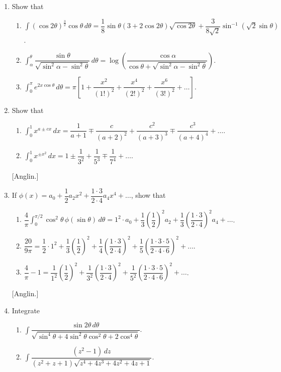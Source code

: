 \documentclass[11pt, a4paper]{article}
\newcommand{\source}[1]{\hfill\textnormal{[#1]}}
\begin{document}
\begin{enumerate}[leftmargin=2em]
\item Show that
\begin{enumerate}[label=(\roman*)]
\item $\displaystyle\int (\cos2\theta)^{\frac32}\cos\theta\,d\theta=\dfrac18\sin\theta(3+2\cos2\theta)\sqrt{\cos2\theta}+\dfrac{3}{8\sqrt2}\sin^{-1}(\sqrt2\sin\theta)$.
\item $\displaystyle\int_\alpha^\theta \dfrac{\sin\theta}{\sqrt{\sin^2\alpha-\sin^2\theta}}\,d\theta=\log\left(\dfrac{\cos\alpha}{\cos\theta+\sqrt{\sin^2\alpha-\sin^2\theta}}\right)$.
\item $\displaystyle\int_0^\pi e^{2x\cos\theta}\,d\theta=\pi\left[1+\dfrac{x^2}{(1!)^2}+\dfrac{x^4}{(2!)^2}+\dfrac{x^6}{(3!)^2}+\dots\right]$.
\end{enumerate}

\item Show that
\begin{enumerate}[label=(\roman*)]
\item $\displaystyle\int_0^1 x^{a\pm cx}\,dx=\dfrac{1}{a+1}\mp\dfrac{c}{(a+2)^2}+\dfrac{c^2}{(a+3)^3}\mp\dfrac{c^3}{(a+4)^4}+\dots$.
\item $\displaystyle\int_0^1 x^{\pm x^2}\,dx=1\pm\dfrac{1}{3^2}+\dfrac{1}{5^3}\mp\dfrac{1}{7^4}+\dots$.
\end{enumerate}
\source{Anglin.}

\item If $\phi(x)=a_0+\dfrac{1}{2}a_2x^2+\dfrac{1\cdot3}{2\cdot4}a_4x^4+\dots$, show that
\begin{enumerate}[label=(\roman*)]
\item $\displaystyle\dfrac{4}{\pi}\int_0^{\pi/2}\cos^2\theta\,\phi(\sin\theta)\,d\theta=1^2\cdot a_0+\dfrac13\left(\dfrac12\right)^2a_2+\dfrac13\left(\dfrac{1\cdot3}{2\cdot4}\right)^2a_4+\dots$.
\item $\displaystyle\dfrac{20}{9\pi}=\dfrac12\cdot1^2+\dfrac13\left(\dfrac12\right)^2+\dfrac14\left(\dfrac{1\cdot3}{2\cdot4}\right)^2+\dfrac15\left(\dfrac{1\cdot3\cdot5}{2\cdot4\cdot6}\right)^2+\dots$.
\item $\displaystyle\dfrac4\pi-1=\dfrac{1}{1^2}\left(\dfrac12\right)^2+\dfrac{1}{3^2}\left(\dfrac{1\cdot3}{2\cdot4}\right)^2+\dfrac{1}{5^2}\left(\dfrac{1\cdot3\cdot5}{2\cdot4\cdot6}\right)^2+\dots$.
\end{enumerate}
\source{Anglin.}

\item Integrate
\begin{enumerate}[label=(\roman*)]
\item $\displaystyle\int \dfrac{\sin2\theta\,d\theta}{\sqrt{\sin^4\theta+4\sin^2\theta\cos^2\theta+2\cos^4\theta}}$.
\item $\displaystyle\int \dfrac{(z^2-1)\,dz}{(z^2+z+1)\sqrt{z^4+4z^3+4z^2+4z+1}}$.
\end{enumerate}


\end{enumerate}
\end{document}
